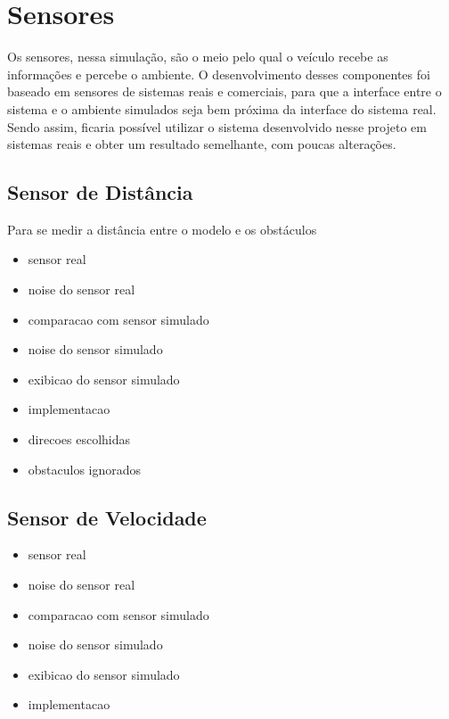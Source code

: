 \section{Sensores}
Os sensores, nessa simulação, são o meio pelo qual o veículo recebe as informações e percebe o ambiente. O desenvolvimento desses componentes foi baseado em sensores de sistemas reais e comerciais, para que a interface entre o sistema e o ambiente simulados seja bem próxima da interface do sistema real. Sendo assim, ficaria possível utilizar o sistema desenvolvido nesse projeto em sistemas reais e obter um resultado semelhante, com poucas alterações.

\subsection{Sensor de Distância}
Para se medir a distância entre o modelo e os obstáculos


\begin{itemize}
  \item sensor real
  \item noise do sensor real
  \item comparacao com sensor simulado
  \item noise do sensor simulado
  \item exibicao do sensor simulado
  \item implementacao
  \item direcoes escolhidas
  \item obstaculos ignorados
\end{itemize}


\subsection{Sensor de Velocidade}


\begin{itemize}
  \item sensor real
  \item noise do sensor real
  \item comparacao com sensor simulado
  \item noise do sensor simulado
  \item exibicao do sensor simulado
  \item implementacao
\end{itemize}
